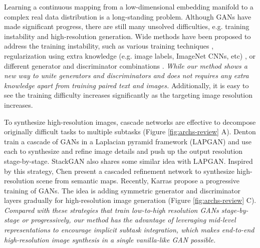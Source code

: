 \documentclass[10pt,twocolumn,letterpaper]{article}
\begin{document}
Learning a continuous mapping from a low-dimensional embedding manifold to a complex real data distribution is a long-standing problem. Although GANs have made significant progress, there are still many unsolved difficulties, e.g. training instability and high-resolution generation. Wide methods have been proposed to address the training instability, such as various training techniques \cite{salimans2016improved,arjovsky2017wasserstein,berthelot2017began,shrivastava2016learning,odena2016conditional}, regularization using extra knowledge (e.g. image labels, ImageNet CNNs, etc) \cite{dosovitskiy2016generating,ledig2016photo,dash2017tac,dash2017tac}, or different generator and discriminator combinations  \cite{metz2016unrolled,durugkar2016generative,yang2017lr,huang2016stacked}. \textit{While our method shows a new way to unite generators and discriminators and does not requires any extra knowledge apart from training paired text and images.} Additionally, it is easy to see the training difficulty increases significantly as the targeting image resolution increases.


To synthesize high-resolution images, cascade networks are effective to decompose originally difficult tasks to multiple subtasks (Figure \ref{fig:archs-review} A).
Denton \etal \cite{denton2015deep} train a cascade of GANs in a Laplacian pyramid framework (LAPGAN) and use each to synthesize and refine image details and push up the output resolution stage-by-stage. StackGAN also shares some similar idea with LAPGAN. Inspired by this strategy, Chen \etal \cite{chen2017photographic} present a cascaded refinement network to synthesize high-resolution scene from semantic maps. 
Recently, Karras \etal \cite{Karras2017progressive} propose a progressive training of GANs. The idea is adding symmetric generator and discriminator layers gradually for high-resolution image generation (Figure \ref{fig:archs-review} C). \textit{Compared with these strategies that train low-to-high resolution GANs stage-by-stage or progressively, our method has the advantage of leveraging mid-level representations to encourage implicit subtask integration, which makes end-to-end high-resolution image synthesis in a single vanilla-like GAN possible.}
\end{document}
